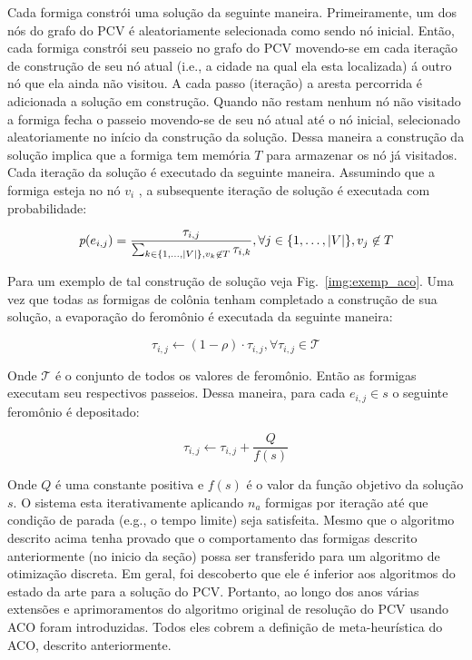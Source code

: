 Cada formiga constrói uma solução da seguinte maneira.
Primeiramente, um dos nós do grafo do PCV é aleatoriamente selecionada como sendo nó inicial.
Então, cada formiga constrói seu passeio no grafo do PCV movendo-se em cada iteração de construção
de seu nó atual (i.e., a cidade na qual ela esta localizada) á outro nó que ela ainda não visitou.
A cada passo (iteração) a aresta percorrida é adicionada a solução em construção. Quando não 
restam nenhum nó não visitado a formiga fecha o passeio movendo-se de seu nó atual até
o nó inicial, selecionado aleatoriamente no início da construção da solução. Dessa maneira a 
construção da solução implica que a formiga tem memória $T$ para armazenar os nó já
visitados. Cada iteração da solução é executado da seguinte maneira. 
Assumindo que a formiga esteja no nó $v_i$ , a subsequente iteração de solução é executada com probabilidade:

\begin{equation}
  \emph{p}(e_{i,j}) = \frac{\tau_{i,j}}{\sum_{k \in \lbrace 1,\dots,
  \vert V \vert\rbrace, v_k \not\in T}\tau_{i,k}},
  \forall j \in \lbrace 1,\dots,\vert V \vert\rbrace, v_j \not\in T
\end{equation}

Para um exemplo de tal construção de solução  veja Fig.~\ref{img:exemp_aco}.
Uma vez que todas as formigas de colônia tenham completado a construção de sua
solução, a evaporação do feromônio é executada da seguinte maneira:

\begin{equation}
  \tau_{i,j} \leftarrow (1-\rho)\cdot \tau_{i,j}, \forall \tau_{i,j}\in \mathcal{T}
\end{equation}

Onde $\mathcal{T }$ é o conjunto de todos os valores de feromônio.
Então as formigas executam seu respectivos passeios. Dessa maneira,
para cada $e_{i,j} \in s$ o seguinte feromônio é depositado:

\begin{equation}
  \tau_{i,j} \leftarrow \tau_{i,j} + \frac{Q}{f(s)}
\end{equation}

Onde $Q$ é uma constante positiva e $f(s)$ é o valor da função objetivo
da solução $s$. O sistema esta iterativamente aplicando $n_a$ 
formigas por iteração até que condição de parada
(e.g., o tempo limite) seja satisfeita.
Mesmo que o algoritmo descrito acima tenha provado que o comportamento das formigas
descrito anteriormente (no inicio da seção) possa ser transferido para um algoritmo 
de otimização discreta. Em geral, foi descoberto que ele é inferior aos algoritmos do estado da arte
para a solução do PCV\@. Portanto, ao longo dos anos várias extensões e aprimoramentos do algoritmo
original de resolução do PCV usando ACO foram introduzidas. Todos eles cobrem a definição de
meta-heurística do ACO,
descrito anteriormente.
